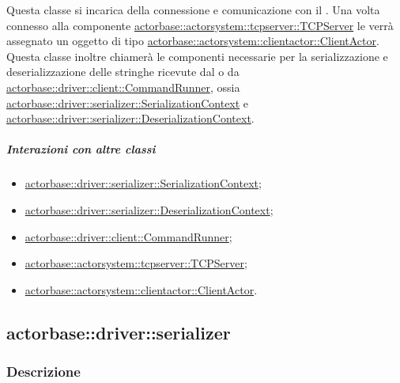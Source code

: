 \documentclass{scalatekids-article}
\begin{document}
Questa classe si incarica della connessione e comunicazione con il . Una volta
connesso alla componente \hyperref[sec:actorbase::actorsystem::tcpserver::TCPServer]{actorbase::actorsystem::\allowbreak{}tcpserver::\allowbreak{}TCPServer}
le verrà assegnato un oggetto di tipo \hyperref[sec:actorbase::actorsystem::clientactor::ClientActor]{actorbase::\allowbreak{}actorsystem::\allowbreak{}clientactor::\allowbreak{}ClientActor}.\\
Questa classe inoltre chiamerà le componenti necessarie per la serializzazione e deserializzazione
delle stringhe ricevute dal  o da \hyperref[sec:actorbase::driver::client::CommandRunner]{actorbase::\allowbreak{}driver::\allowbreak{}client::\allowbreak{}CommandRunner},
ossia \hyperref[sec:actorbase::driver::serializer::SerializationContext]{actorbase::\allowbreak{}driver::\allowbreak{}serializer::\allowbreak{}SerializationContext}
e \hyperref[sec:actorbase::driver::serializer::Deserializationtext]{actorbase::\allowbreak{}driver::\allowbreak{}serializer::\allowbreak{}DeserializationContext}.

\subparagraph{Interazioni con altre classi}
\begin{itemize}
\item \hyperref[sec:actorbase::driver::serializer::SerializationContext]{actorbase::driver::serializer::SerializationContext};
\item \hyperref[sec:actorbase::driver::serializer::Deserializationtext]{actorbase::driver::serializer::DeserializationContext};
\item \hyperref[sec:actorbase::driver::client::CommandRunner]{actorbase::driver::client::CommandRunner};
\item \hyperref[sec:actorbase::actorsystem::tcpserver::TCPServer]{actorbase::actorsystem::tcpserver::TCPServer};
\item \hyperref[sec:actorbase::actorbase::actorsystem::clientactor::ClientActor]{actorbase::actorsystem::clientactor::ClientActor}.
\end{itemize}

\subsection{actorbase::driver::serializer}
\label{sec:actorbase::driver::serializer}

\subsubsection{Descrizione}
\end{document}
